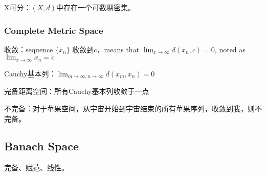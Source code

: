 \documentclass[UTF8]{../../09-Mathematics}
\begin{document}
\begin{definition}
    X可分：$(X,d)$中存在一个可数稠密集。
\end{definition}


\subsubsection{Complete Metric Space}

\begin{definition}
    收敛：sequence $\{ x_n \}$ 收敛到c，means that $\lim_{x \to \infty} d(x_n, c) = 0$, noted as $\lim_{x \to \infty} x_n = c $
\end{definition}

\begin{definition}
    Cauchy基本列：$\lim_{m \to \infty,n \to \infty}d(x_m, x_n)=0  $
\end{definition}

\begin{definition}
    完备距离空间：所有Cauchy基本列收敛于一点
\end{definition}

\begin{definition}
  不完备：对于苹果空间，从宇宙开始到宇宙结束的所有苹果序列，收敛到我，则不完备。
\end{definition}

\subsection{Banach Space}

完备、赋范、线性。
\end{document}
